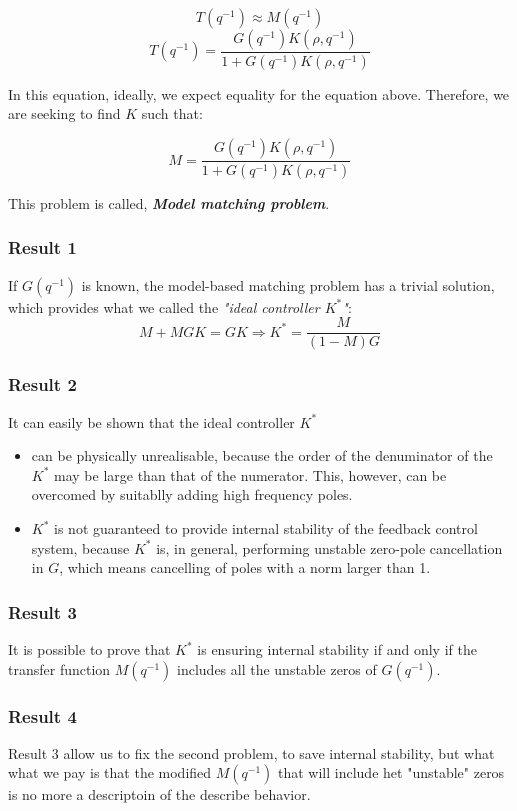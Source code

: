 \[
T(q^{-1}) \approx M(q^{-1})
\]
\[
T(q^{-1}) = \frac{G(q^{-1}) K(\rho,q^{-1})}{1+G(q^{-1}) K(\rho,q^{-1})}
\]

In this equation, ideally, we expect equality for the equation above. Therefore, we are seeking to find $K$ such that:

\[
M =  \frac{G(q^{-1}) K(\rho,q^{-1})}{1+G(q^{-1}) K(\rho,q^{-1})}
\]

This problem is called, \textbf{\textit{Model matching problem}}.

\subsubsection{Result 1}
If $G(q^{-1})$ is known, the model-based matching problem has a trivial solution, which provides what we called the \textit{"ideal controller $K^{*}$"}:
\[
M + MGK = GK \Rightarrow K^{*} = \frac{M}{(1-M)G}
\]

\subsubsection{Result 2}
It can easily be shown that the ideal controller $K^{*}$
\begin{itemize}
    \item can be physically unrealisable, because the order of the denuminator of the $K^{*}$ may be large than that of the numerator. This, however, can be overcomed by suitablly adding high frequency poles.
    \item $K^{*}$ is not guaranteed to provide internal stability of the feedback control system, because $K^{*}$ is, in general, performing unstable zero-pole cancellation in $G$, which means cancelling of poles with a norm larger than 1.
\end{itemize}

\subsubsection{Result 3}
It is possible to prove that $K^{*}$ is ensuring internal stability if and only if the transfer function $M(q^{-1})$ includes all the unstable zeros of $G(q^{-1})$. \\

\subsubsection{Result 4}
Result 3 allow us to fix the second problem, to save internal stability, but what what we pay is that the modified $M(q^{-1})$ that will include het "unstable" zeros is no more a descriptoin of the describe behavior.\\

